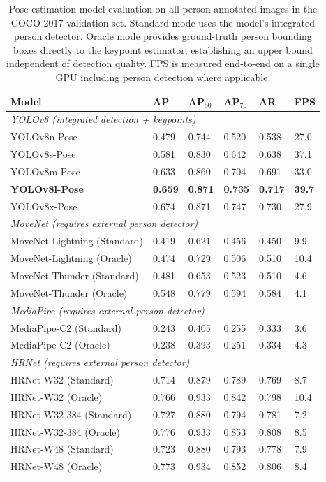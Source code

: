 \begin{table}[ht]
	\centering
	\caption{Pose estimation model evaluation on all person-annotated 
		images in the COCO 2017 validation set. Standard mode uses the 
		model's integrated person detector. Oracle mode provides 
		ground-truth person bounding boxes directly to the keypoint 
		estimator, establishing an upper bound independent of detection 
		quality. FPS is measured end-to-end on a single GPU including 
		person detection where applicable.}
	\label{tab:pose_model_eval}
	\begin{tabular}{llllll}
		\hline
		\textbf{Model} & \textbf{AP} & \textbf{AP$_{50}$} & 
		\textbf{AP$_{75}$} & \textbf{AR} & \textbf{FPS} \\
		\hline
		\multicolumn{6}{l}{\textit{YOLOv8 (integrated detection + 
				keypoints)}} \\
		YOLOv8n-Pose          & 0.479 & 0.744 & 0.520 & 0.538 & 27.0 \\
		YOLOv8s-Pose          & 0.581 & 0.830 & 0.642 & 0.638 & 37.1 \\
		YOLOv8m-Pose          & 0.633 & 0.860 & 0.704 & 0.691 & 33.0 \\
		\textbf{YOLOv8l-Pose} & \textbf{0.659} & \textbf{0.871} & 
		\textbf{0.735} & \textbf{0.717} & \textbf{39.7} \\
		YOLOv8x-Pose          & 0.674 & 0.871 & 0.747 & 0.730 & 27.9 \\
		\hline
		\multicolumn{6}{l}{\textit{MoveNet (requires external person 
				detector)}} \\
		MoveNet-Lightning (Standard) & 0.419 & 0.621 & 0.456 & 0.450 & 9.9 \\
		MoveNet-Lightning (Oracle)   & 0.474 & 0.729 & 0.506 & 0.510 & 10.4 \\
		MoveNet-Thunder (Standard)   & 0.481 & 0.653 & 0.523 & 0.510 & 4.6 \\
		MoveNet-Thunder (Oracle)     & 0.548 & 0.779 & 0.594 & 0.584 & 4.1 \\
		\hline
		\multicolumn{6}{l}{\textit{MediaPipe (requires external person 
				detector)}} \\
		MediaPipe-C2 (Standard)      & 0.243 & 0.405 & 0.255 & 0.333 & 3.6 \\
		MediaPipe-C2 (Oracle)        & 0.238 & 0.393 & 0.251 & 0.334 & 4.3 \\
		\hline
		\multicolumn{6}{l}{\textit{HRNet (requires external person 
				detector)}} \\
		HRNet-W32 (Standard)         & 0.714 & 0.879 & 0.789 & 0.769 & 8.7 \\
		HRNet-W32 (Oracle)           & 0.766 & 0.933 & 0.842 & 0.798 & 10.4 \\
		HRNet-W32-384 (Standard)     & 0.727 & 0.880 & 0.794 & 0.781 & 7.2 \\
		HRNet-W32-384 (Oracle)       & 0.776 & 0.933 & 0.853 & 0.808 & 8.5 \\
		HRNet-W48 (Standard)         & 0.723 & 0.880 & 0.793 & 0.778 & 7.9 \\
		HRNet-W48 (Oracle)           & 0.773 & 0.934 & 0.852 & 0.806 & 8.4 \\
		\hline
	\end{tabular}
\end{table}

